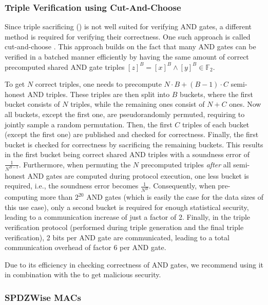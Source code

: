 \documentclass[a4paper,11pt,
]{article}
\newcommand{\F}{\ensuremath{\mathbb{F}}\xspace}
\newcommand{\sharedB}[1]{\ensuremath{[{#1}]^B}}
\begin{document}
\subsubsection{Triple Verification using Cut-And-Choose} \label{sec:cutandchoose}

Since triple sacrificing () is not well suited for verifying AND gates, a different method is required for verifying their correctness. One such approach is called cut-and-choose \cite{DBLP:conf/sp/ArakiBFLLNOWW17}. This approach builds on the fact that many AND gates can be verified in a batched manner efficiently by having the same amount of correct precomputed shared AND gate triples $\sharedB{z} = \sharedB{x} \wedge \sharedB{y} \in \F_2$.

To get $N$ correct triples, one needs to precompute $N\cdot B + (B-1)\cdot C$ semi-honest AND triples. These triples are then split into $B$ buckets, where the first bucket consists of $N$ triples, while the remaining ones consist of $N+C$ ones. Now all buckets, except the first one, are pseudorandomly permuted, requiring to jointly sample a random permutation. Then, the first $C$ triples of each bucket (except the first one) are published and checked for correctness. Finally, the first bucket is checked for correctness by sacrificing the remaining buckets. This results in the first bucket being correct shared AND triples with a soundness error of $\frac{1}{N^{B-1}}$. Furthermore, when permuting the $N$ precomputed triples \textit{after} all semi-honest AND gates are computed during protocol execution, one less bucket is required, i.e., the soundness error becomes $\frac{1}{N^B}$. Consequently, when pre-computing more than $2^{20}$ AND gates (which is easily the case for the data sizes of this use case), only a second bucket is required for enough statistical security, leading to a communication increase of just a factor of 2. Finally, in the triple verification protocol (performed during triple generation and the final triple verification), 2 bits per AND gate are communicated, leading to a total communication overhead of factor 6 per AND gate.

Due to its efficiency in checking correctness of AND gates, we recommend using it in combination with the  to get malicious security.

\subsubsection{SPDZWise MACs} \label{sec:spdzwise}
\end{document}
